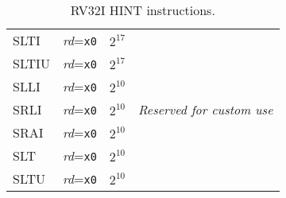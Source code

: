 \begin{table}[hbt]
\begin{tabular}{|l|l|c|l|}
  SLTI                  & {\em rd}={\tt x0}                           & $2^{17}$                    & \multirow{7}{*}{\em Reserved for custom use} \\ \cline{1-3}
  SLTIU                 & {\em rd}={\tt x0}                           & $2^{17}$                    & \\ \cline{1-3}
  SLLI                  & {\em rd}={\tt x0}                           & $2^{10}$                    & \\ \cline{1-3}
  SRLI                  & {\em rd}={\tt x0}                           & $2^{10}$                    & \\ \cline{1-3}
  SRAI                  & {\em rd}={\tt x0}                           & $2^{10}$                    & \\ \cline{1-3}
  SLT                   & {\em rd}={\tt x0}                           & $2^{10}$                    & \\ \cline{1-3}
  SLTU                  & {\em rd}={\tt x0}                           & $2^{10}$                    & \\ \hline
\end{tabular}
\caption{RV32I HINT instructions.}
\label{tab:rv32i-hints}
\end{table}

